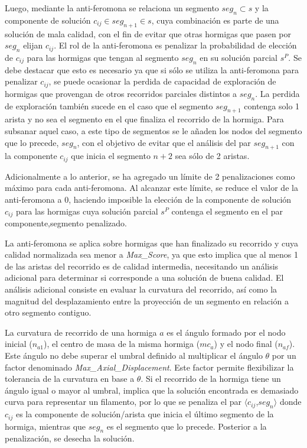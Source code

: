 Luego, mediante la anti-feromona se relaciona un segmento $seg_n \subset s$ y la componente de soluci\'on $c_{ij} \in seg_{n+1} \in s$, cuya combinaci\'on es parte de una soluci\'on de mala calidad, con el fin de evitar que otras hormigas que pasen por $seg_n$ elijan $c_{ij}$. El rol de la anti-feromona es penalizar la probabilidad de elecci\'on de $c_{ij}$ para las hormigas que tengan al segmento $seg_n$ en su soluci\'on parcial $s^{P}$. Se debe destacar que esto es necesario ya que si s\'olo se utiliza la anti-feromona para penalizar $c_{ij}$, se puede ocasionar la perdida de capacidad de exploraci\'on de hormigas que provengan de otros recorridos parciales distintos a $seg_n$. La perdida de exploraci\'on tambi\'en sucede en el caso que el segmento $seg_{n+1}$ contenga solo 1 arista y no sea el segmento en el que finaliza el recorrido de la hormiga. Para subsanar aquel caso, a este tipo de segmentos se le a\~naden los nodos del segmento que lo precede, $seg_{n}$, con el objetivo de evitar que el an\'alisis del par $seg_{n+1}$ con la componente $c_{ij}$ que inicia el segmento $n+2$ sea s\'olo de 2 aristas.


Adicionalmente a lo anterior, se ha agregado un l\'imite de 2 penalizaciones como m\'aximo para cada anti-feromona. Al alcanzar este l\'imite, se reduce el valor de la anti-feromona a 0, haciendo imposible la elecci\'on de la componente de soluci\'on $c_{ij}$ para las hormigas cuya soluci\'on parcial $s^{P}$ contenga el segmento en el par componente,segmento penalizado.


La anti-feromona se aplica sobre hormigas que han finalizado su recorrido y cuya calidad normalizada sea menor a {\it Max\_Score}, ya que esto implica que al menos 1 de las aristas del recorrido es de calidad intermedia, necesitando un an\'alisis adicional para determinar si corresponde a una soluci\'on de buena calidad. El an\'alisis adicional consiste en evaluar la curvatura del recorrido, as\'i como la magnitud del desplazamiento entre la proyecci\'on de un segmento en relaci\'on a otro segmento contiguo. 

La curvatura de recorrido de una hormiga $a$ es el \'angulo formado por el nodo inicial ($n_{a1}$), el centro de masa de la misma hormiga ($mc_{a}$) y el nodo final ($n_{af}$). Este \'angulo no debe superar el umbral definido al multiplicar el \'angulo $\theta$ por un factor denominado {\it Max\_Axial\_Displacement}. Este factor permite flexibilizar la tolerancia de la curvatura en base a $\theta$. Si el recorrido de la hormiga tiene un \'angulo igual o mayor al umbral, implica que la soluci\'on encontrada es demasiado curva para representar un filamento, por lo que se penaliza el par $\langle c_{ij}$,$ seg_{n}\rangle$ donde $c_{ij}$ es la componente de soluci\'on/arista que inicia el \'ultimo segmento de la hormiga, mientras que $seg_{n}$ es el segmento que lo precede. Posterior a la penalizaci\'on, se desecha la soluci\'on.

